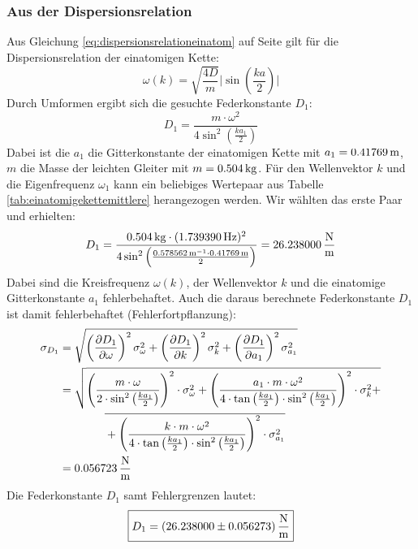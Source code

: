 \documentclass[a4paper,titlepage]{scrartcl}
\numberwithin{equation}{section}
\begin{document}
\subsubsection{Aus der Dispersionsrelation}
Aus Gleichung \ref{eq:dispersionsrelationeinatom} auf Seite \pageref{eq:dispersionsrelationeinatom} gilt für die Dispersionsrelation der einatomigen Kette:
\begin{equation*}
\omega(k)=\sqrt{\frac{4D}{m}} \bigg|\sin{\left( \frac{ka}{2} \right)}\bigg|
\end{equation*}
Durch Umformen ergibt sich die gesuchte Federkonstante $D_1$:
\begin{equation*}
D_1=\frac{m \cdot \omega^2}{4 \sin^2{\left( \frac{ka_1}{2} \right)}}
\end{equation*}
Dabei ist die $a_1$ die Gitterkonstante der einatomigen Kette mit $a_1=\unit[0.41769]{m}$, $m$ die Masse der leichten Gleiter mit $m=\unit[0.504]{kg}$. Für den Wellenvektor $k$ und die Eigenfrequenz $\omega_1$ kann ein beliebiges Wertepaar aus Tabelle \ref{tab:einatomigekettemittlere} herangezogen werden. Wir wählten das erste Paar und erhielten:
\begin{equation*}
D_1=\frac{\unit[0.504]{kg} \cdot (\unit[1.739390]{Hz})^2}{4 \sin^2{\left( \frac{\unit[0.578562]{m^{-1}} \cdot \unit[0.41769]{m}}{2} \right)}}=\unit[26.238000]{\frac{N}{m}}
\end{equation*}
Dabei sind die Kreisfrequenz $\omega(k)$, der Wellenvektor $k$ und die einatomige Gitterkonstante $a_1$ fehlerbehaftet. Auch die daraus berechnete Federkonstante $D_1	$ ist damit fehlerbehaftet (Fehlerfortpflanzung):
\begin{align*}
\sigma_{D_1}&=\sqrt{\left( \frac{\partial D_1}{\partial \omega} \right)^2 \sigma^2_{\omega} + \left( \frac{\partial D_1}{\partial k} \right)^2 \sigma^2_k + \left( \frac{\partial D_1}{\partial a_1} \right)^2 \sigma^2_{a_1}}\\
&=\sqrt{ \left( \frac{m \cdot \omega}{2 \cdot \sin^2{\left( \frac{k a_1}{2} \right)}} \right)^2 \cdot \sigma^2_{\omega} + \left( \frac{a_1 \cdot m \cdot \omega^2}{4 \cdot \tan{\left( \frac{k a_1}{2} \right)} \cdot \sin^2{\left( \frac{k a_1}{2} \right)}} \right)^2 \cdot \sigma^2_k + }\\ 
& \quad \quad \quad \quad \overline{\rule{0pt}{2.5ex} + \left( \frac{k \cdot m \cdot \omega^2}{4 \cdot \tan{\left( \frac{k a_1}{2} \right) \cdot \sin^2{\left( \frac{k a_1}{2} \right)}}} \right)^2 \cdot \sigma^2_{a_1}  }\\
&=\unit[0.056723]{\frac{N}{m}}
\end{align*}
Die Federkonstante $D_1$ samt Fehlergrenzen lautet:
\begin{equation*}
\boxed{D_1=\unit[(26.238000 \pm 0.056273)]{\frac{N}{m}}}
\end{equation*}
\end{document}
